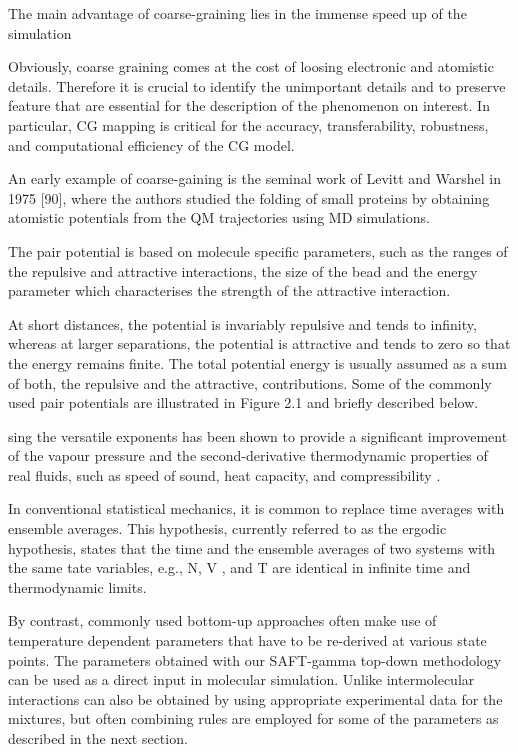 

The main advantage of
coarse-graining lies in the immense speed up of the simulation

Obviously, coarse graining comes at the cost of loosing electronic and atomistic details.
Therefore it is crucial to identify the unimportant details and to preserve feature that are
essential for the description of the phenomenon on interest. In particular, CG mapping
is critical for the accuracy, transferability, robustness, and computational efficiency of the
CG model.



An early example of coarse-gaining is the seminal
work of Levitt and Warshel in 1975 [90], where the authors studied the folding of small
proteins by obtaining atomistic potentials from the QM trajectories using MD simulations. 



The pair potential is based on molecule specific
parameters, such as the ranges of the repulsive and attractive interactions, the size of
the bead and the energy parameter which characterises the strength of the attractive interaction.

At short distances, the potential is
invariably repulsive and tends to infinity, whereas at larger separations, the potential is
attractive and tends to zero so that the energy remains finite. The total potential energy
is usually assumed as a sum of both, the repulsive and the attractive, contributions. Some
of the commonly used pair potentials are illustrated in Figure 2.1 and briefly described
below.

sing the versatile exponents has been shown to provide
a significant improvement of the vapour pressure and the second-derivative thermodynamic
properties of real fluids, such as speed of sound, heat capacity, and compressibility \cite{avendano2011,lafitte2013,lafitte2006}.

In conventional statistical mechanics, it is common to replace time
averages with ensemble averages. This hypothesis, currently referred to as the ergodic
hypothesis, states that the time and the ensemble averages of two systems with the same tate variables, e.g., N, V , and T are identical in infinite time and thermodynamic limits.

By contrast, commonly used
bottom-up approaches often make use of temperature dependent parameters that have to
be re-derived at various state points. The parameters obtained with our SAFT-gamma top-down
methodology can be used as a direct input in molecular simulation. Unlike intermolecular
interactions can also be obtained by using appropriate experimental data for the mixtures,
but often combining rules are employed for some of the parameters as described in the
next section.

